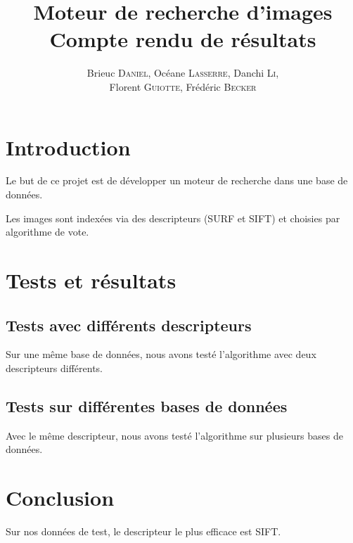\documentclass{article}
\author{Brieuc \textsc{Daniel}, Océane \textsc{Lasserre}, Danchi \textsc{Li}, \\ Florent \textsc{Guiotte}, Frédéric \textsc{Becker}}
\title{Moteur de recherche d'images \\ \Large{Compte rendu de résultats}}
\begin{document}
\maketitle
\tableofcontents

\section{Introduction}
Le but de ce projet est de développer un moteur de recherche dans une base de données. 

Les images sont indexées via des descripteurs (SURF et SIFT) et choisies par algorithme de vote.

\section{Tests et résultats}
\subsection{Tests avec différents descripteurs}
Sur une même base de données, nous avons testé l'algorithme avec deux descripteurs différents.

\subsection{Tests sur différentes bases de données}
Avec le même descripteur, nous avons testé l'algorithme sur plusieurs bases de données.

\section{Conclusion}
Sur nos données de test, le descripteur le plus efficace est SIFT. 
\end{document}
